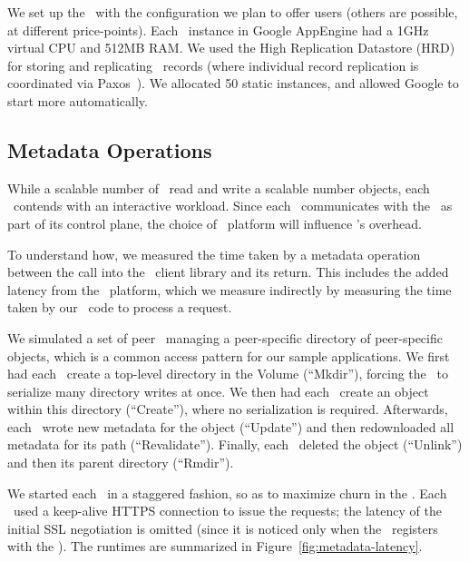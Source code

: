 We set up the \MS\ with the configuration we plan to offer users
(others are possible, at different price-points).  Each \MS\ instance
in Google AppEngine had a 1GHz virtual CPU and 512MB RAM.  We used the
High Replication Datastore (HRD) for storing and replicating \MS\
records (where individual record replication is coordinated via
Paxos~\cite{paxos}).  We allocated 50 static instances, and
allowed Google to start more automatically.

\subsection{Metadata Operations}


While a scalable number of \SGs\ read
and write a scalable number objects,
each \SG\ contends with an interactive workload.
Since each \SG\ communicates with the \MS\ as part of its control plane,
the choice of \MS\ platform will influence \Syndicate's overhead.

To understand how, we measured the time taken by a metadata operation
between the call into the \MS\ client library
and its return.  This includes the added latency
from the \MS\ platform, which we measure indirectly by 
measuring the time taken by our \MS\ code to process a request.

We simulated a set of peer \SGs\
managing a peer-specific directory of peer-specific objects, which 
is a common access pattern for our sample applications.
We first had each \SG\ create
a top-level directory in the Volume (``Mkdir''), forcing the \MS\ to serialize
many directory writes at once.  We then had each \SG\ create an object within
this directory (``Create''), where no serialization is required.  Afterwards,
each \SG\ wrote new metadata for the object (``Update'') and then redownloaded all 
metadata for its path (``Revalidate'').  Finally, each \SG\ deleted the object
(``Unlink'') and then its parent directory (``Rmdir'').

We started each \SGs\ in a staggered fashion, so as to 
maximize churn in the \MS.  Each \SG\ used a keep-alive
HTTPS connection to issue the requests; the latency of the initial
SSL negotiation is omitted (since it is noticed only when the \SG\ registers 
with the \MS).  The runtimes are summarized in Figure~\ref{fig:metadata-latency}.


